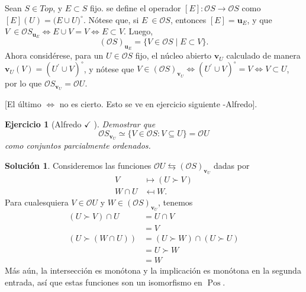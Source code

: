 \documentclass[12pt,letterpaper,titlepage]{article}
\newtheorem{exe}{Ejercicio}
\theoremstyle{definition}
\newtheorem*{sol}{Solución}
\renewcommand\cal[1]{\mathcal{#1}}
\newcommand\unuc[1]{\mathbf u_{#1}}
\newcommand\vnuc[1]{\mathbf v_{#1}}
\newcommand\<{\langle}
\renewcommand\>{\rangle}
\DeclareMathOperator{\Pos}{Pos}
\begin{document}
Sean $S\in Top$, y $E\subset S$ fijo. se define el operador $[E]:\cal O S\to \cal O S$ como $[E](U)=\big(E\cup U\big)^{\circ}$.
Nótese que, si $E \ \in \cal O S$, entonces $[E]=\unuc E$, y que $V \ \in \cal O S_{\unuc E} \iff E\cup V=V \iff E\subset V$.
Luego,
\[
    (\cal OS)_{\unuc E} = \{V\in \cal OS \mid E\subset V\}
.\]
Ahora considérese, para un $U\in \cal O S$ fijo, el núcleo abierto $\vnuc U$ calculado de manera $\vnuc U(V)=(U^{\prime}\cup V)^{\circ}$, y nótese que $V \in(\cal OS)_{\vnuc U} \iff (U^{\prime}\cup V)^{\circ}=V \iff V\subset U$, por lo que $\cal O S_{\vnuc U}=\cal O U$.

[El último $\iff$ no es cierto.
Esto se ve en ejercicio siguiente -Alfredo].
\begin{exe}[Alfredo $\checkmark$ ]
    Demostrar que
    \[
        \cal OS_{\vnuc U} \simeq
        \{V\in \cal OS : V\subseteq U\} = \cal OU
    \]
    como conjuntos parcialmente ordenados.
\end{exe}
\begin{sol}
    Consideremos las funciones
    $\cal OU\leftrightarrows(\cal OS)_{\vnuc U}$
    dadas por
    \begin{align*}
         V &\mapsto (U\succ V) \\
         W\cap U &\mapsfrom W.
    \end{align*}
    Para cualesquiera $V\in \cal OU$
    y $W\in (\cal OS)_{\vnuc U}$, tenemos
    \begin{align*}
        (U\succ V)\cap U
        &= U\cap V \\
        &= V \\
        (U\succ (W\cap U))
        &= (U\succ W)\cap(U\succ U) \\
        &= U\succ W \\
        &= W
    \end{align*}
    Más aún, la intersección es monótona
    y la implicación es monótona en la segunda entrada, así que
    estas funciones son un isomorfismo en $\Pos$.
\end{sol}
\end{document}
